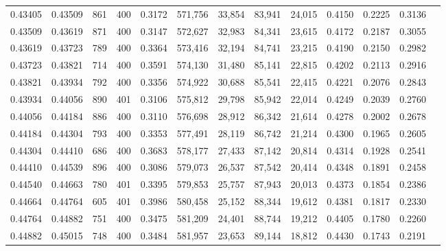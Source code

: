 \begin{tabular}{rrrrrrrrrrrrr}
0.43405 & 0.43509 &    861 & 400 &                                     0.3172 & 571,756 &  33,854 &  83,941 &  24,015 & 0.4150 & 0.2225 & 0.3136 \\
0.43509 & 0.43619 &    871 & 400 &                                     0.3147 & 572,627 &  32,983 &  84,341 &  23,615 & 0.4172 & 0.2187 & 0.3055 \\
0.43619 & 0.43723 &    789 & 400 &                                     0.3364 & 573,416 &  32,194 &  84,741 &  23,215 & 0.4190 & 0.2150 & 0.2982 \\
0.43723 & 0.43821 &    714 & 400 &                                     0.3591 & 574,130 &  31,480 &  85,141 &  22,815 & 0.4202 & 0.2113 & 0.2916 \\
0.43821 & 0.43934 &    792 & 400 &                                     0.3356 & 574,922 &  30,688 &  85,541 &  22,415 & 0.4221 & 0.2076 & 0.2843 \\
0.43934 & 0.44056 &    890 & 401 &                                     0.3106 & 575,812 &  29,798 &  85,942 &  22,014 & 0.4249 & 0.2039 & 0.2760 \\
0.44056 & 0.44184 &    886 & 400 &                                     0.3110 & 576,698 &  28,912 &  86,342 &  21,614 & 0.4278 & 0.2002 & 0.2678 \\
0.44184 & 0.44304 &    793 & 400 &                                     0.3353 & 577,491 &  28,119 &  86,742 &  21,214 & 0.4300 & 0.1965 & 0.2605 \\
0.44304 & 0.44410 &    686 & 400 &                                     0.3683 & 578,177 &  27,433 &  87,142 &  20,814 & 0.4314 & 0.1928 & 0.2541 \\
0.44410 & 0.44539 &    896 & 400 &                                     0.3086 & 579,073 &  26,537 &  87,542 &  20,414 & 0.4348 & 0.1891 & 0.2458 \\
0.44540 & 0.44663 &    780 & 401 &                                     0.3395 & 579,853 &  25,757 &  87,943 &  20,013 & 0.4373 & 0.1854 & 0.2386 \\
0.44664 & 0.44764 &    605 & 401 &                                     0.3986 & 580,458 &  25,152 &  88,344 &  19,612 & 0.4381 & 0.1817 & 0.2330 \\
0.44764 & 0.44882 &    751 & 400 &                                     0.3475 & 581,209 &  24,401 &  88,744 &  19,212 & 0.4405 & 0.1780 & 0.2260 \\
0.44882 & 0.45015 &    748 & 400 &                                     0.3484 & 581,957 &  23,653 &  89,144 &  18,812 & 0.4430 & 0.1743 & 0.2191 \\

\end{tabular}
